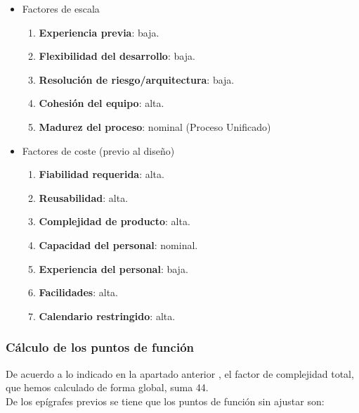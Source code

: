 \documentclass[11pt, a4paper, twoside, titlepage]{article}
\begin{document}
				\begin{itemize}

				\item Factores de escala

				\begin{enumerate}
					\item \textbf{Experiencia previa}: baja.
					\item \textbf{Flexibilidad del desarrollo}: baja.
					\item \textbf{Resolución de riesgo/arquitectura}: baja.
					\item \textbf{Cohesión del equipo}: alta.
					\item \textbf{Madurez del proceso}: nominal (Proceso Unificado)
				\end{enumerate}

				\item Factores de coste (previo al diseño)

				\begin{enumerate}
					\item \textbf{Fiabilidad requerida}: alta.
					\item \textbf{Reusabilidad}: alta.
					\item \textbf{Complejidad de producto}: alta.
					\item \textbf{Capacidad del personal}: nominal.
					\item \textbf{Experiencia del personal}: baja.
					\item \textbf{Facilidades}: alta.
					\item \textbf{Calendario restringido}: alta.
				\end{enumerate}

				\end{itemize}

		\subsubsection{Cálculo de los puntos de función}
			De acuerdo a lo indicado en la apartado anterior \textit{}, el factor de complejidad total, que hemos calculado de forma global, suma 44.\\

			De los epígrafes previos se tiene que los puntos de función sin ajustar son:
\end{document}

